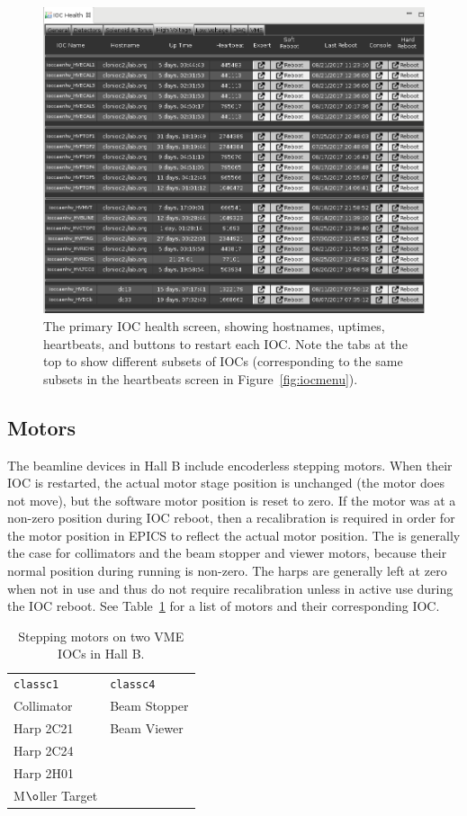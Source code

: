 \documentclass[amsmath,amssymb,notitlepage,11pt]{revtex4}
\begin{document}
\begin{figure}[htbp]\centering
    \includegraphics[width=\textwidth,trim={0 5.2cm 0 0},clip]{pics/iochealth}
  \caption{The primary IOC health screen, showing hostnames, uptimes, heartbeats, and buttons to restart each IOC.  Note the tabs at the top to show different subsets of IOCs (corresponding to the same subsets in the heartbeats screen in Figure~\ref{fig:iocmenu}).\label{fig:iochealth}}
\end{figure}

\subsection{Motors}
The beamline devices in Hall B include encoderless stepping motors.  When their IOC is restarted, the actual motor stage position is unchanged (the motor does not move), but the software motor position is reset to zero.  If the motor was at a non-zero position during IOC reboot, then a recalibration is required in order for the motor position in EPICS to reflect the actual motor position.  The is generally the case for collimators and the beam stopper and viewer motors, because their normal position during running is non-zero.  The harps are generally left at zero when not in use and thus do not require recalibration unless in active use during the IOC reboot.  See Table~\ref{tab:stepmot} for a list of motors and their corresponding IOC.
\begin{table}[htpb]\centering
  \begin{tabular}{ll}\toprule[1.5pt]
    \texttt{classc1} & \texttt{classc4} \\ \cmidrule[0.5pt]{1-2}
    Collimator       & Beam Stopper \\
    Harp 2C21        & Beam Viewer \\
    Harp 2C24        & \\
    Harp 2H01        & \\
    M$\o$ller Target & \\
    \bottomrule[1.5pt]
  \end{tabular}
  \caption{Stepping motors on two VME IOCs in Hall B.\label{tab:stepmot}}  
\end{table}
\end{document}
